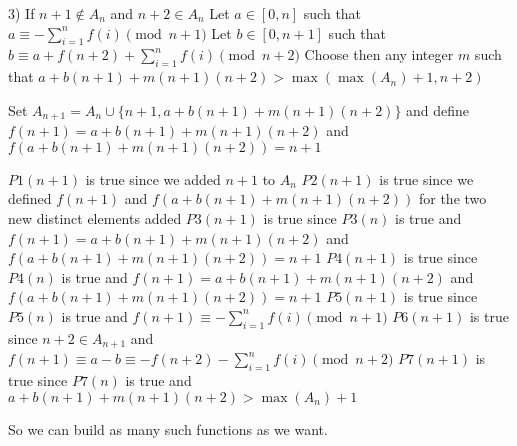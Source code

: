 \begin{solution}
3) If $n+1\notin A_n$ and $n+2\in A_n$
Let $a\in[0,n]$ such that $a\equiv -\sum_{i=1}^nf(i)\pmod{n+1}$
Let $b\in[0,n+1]$ such that $b\equiv a+f(n+2)+\sum_{i=1}^nf(i)\pmod{n+2}$
Choose then any integer $m$ such that $a+b(n+1)+m(n+1)(n+2)>\max(\max(A_n)+1,n+2)$

Set $A_{n+1}=A_n\cup\{n+1,a+b(n+1)+m(n+1)(n+2)\}$ and define $f(n+1)=a+b(n+1)+m(n+1)(n+2)$ and $f(a+b(n+1)+m(n+1)(n+2))=n+1$

$P1(n+1)$ is true since we added $n+1$ to $A_n$
$P2(n+1)$ is true since we defined $f(n+1)$ and $f(a+b(n+1)+m(n+1)(n+2))$ for the two new distinct elements added
$P3(n+1)$ is true since $P3(n)$ is true and $f(n+1)=a+b(n+1)+m(n+1)(n+2)$ and $f(a+b(n+1)+m(n+1)(n+2))=n+1$
$P4(n+1)$ is true since $P4(n)$ is true and $f(n+1)=a+b(n+1)+m(n+1)(n+2)$ and $f(a+b(n+1)+m(n+1)(n+2))=n+1$
$P5(n+1)$ is true since $P5(n)$ is true and $f(n+1)\equiv -\sum_{i=1}^nf(i)\pmod{n+1}$
$P6(n+1)$ is true since $n+2\in A_{n+1}$ and $f(n+1)\equiv a-b\equiv -f(n+2)-\sum_{i=1}^nf(i)\pmod{n+2}$
$P7(n+1)$ is true since $P7(n)$ is true and $a+b(n+1)+m(n+1)(n+2)>\max(A_n)+1$

So we can build as many such functions as we want.


\end{solution}



